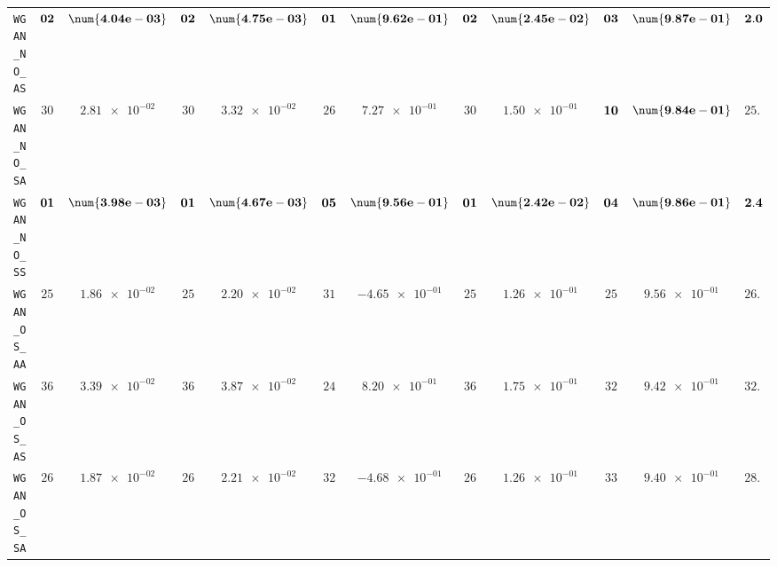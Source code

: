 \begin{xltabular}{\textwidth}{l||cC|cC|cC|cC|cC||c}
	\texttt{WGAN\_NO\_AS} & $\bf 02$ & $\bf \num{4.04e-03}$ & $\bf 02$ & $\bf \num{4.75e-03}$ & $\bf 01$ & $\bf \num{9.62e-01}$ & $\bf 02$ & $\bf \num{2.45e-02}$ & $\bf 03$ & $\bf \num{9.87e-01}$ & $\bf 2.0$  \\
	\texttt{WGAN\_NO\_SA} & $ 30$ & $ \num{2.81e-02}$ & $ 30$ & $ \num{3.32e-02}$ & $ 26$ & $ \num{7.27e-01}$ & $ 30$ & $ \num{1.50e-01}$ & $\bf 10$ & $\bf \num{9.84e-01}$ & $ 25.2$  \\
	\texttt{WGAN\_NO\_SS} & $\bf 01$ & $\bf \num{3.98e-03}$ & $\bf 01$ & $\bf \num{4.67e-03}$ & $\bf 05$ & $\bf \num{9.56e-01}$ & $\bf 01$ & $\bf \num{2.42e-02}$ & $\bf 04$ & $\bf \num{9.86e-01}$ & $\bf 2.4$  \\
	\texttt{WGAN\_OS\_AA} & $ 25$ & $ \num{1.86e-02}$ & $ 25$ & $ \num{2.20e-02}$ & $ 31$ & $ \num{-4.65e-01}$ & $ 25$ & $ \num{1.26e-01}$ & $ 25$ & $ \num{9.56e-01}$ & $ 26.2$  \\
	\texttt{WGAN\_OS\_AS} & $ 36$ & $ \num{3.39e-02}$ & $ 36$ & $ \num{3.87e-02}$ & $ 24$ & $ \num{8.20e-01}$ & $ 36$ & $ \num{1.75e-01}$ & $ 32$ & $ \num{9.42e-01}$ & $ 32.8$  \\
	\texttt{WGAN\_OS\_SA} & $ 26$ & $ \num{1.87e-02}$ & $ 26$ & $ \num{2.21e-02}$ & $ 32$ & $ \num{-4.68e-01}$ & $ 26$ & $ \num{1.26e-01}$ & $ 33$ & $ \num{9.40e-01}$ & $ 28.6$  \\

\end{xltabular}
